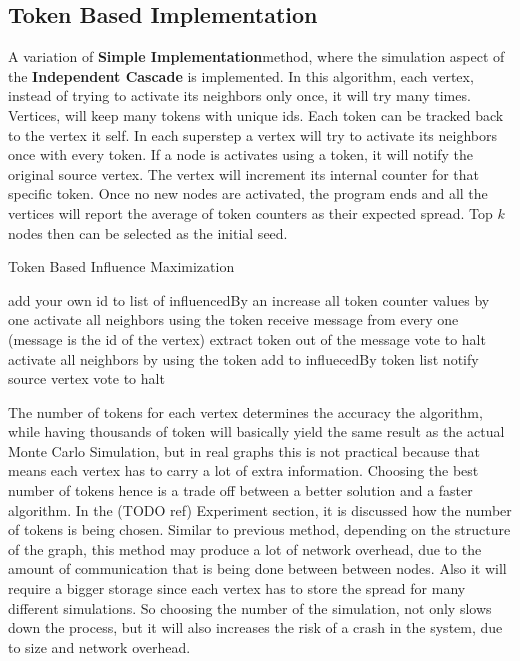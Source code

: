 \documentclass[english]{tktltiki}
\begin{document}
\subsection{Token Based Implementation}
A variation of \textbf{Simple Implementation}method, where the simulation aspect of the \textbf{Independent Cascade} is implemented. In this algorithm, each vertex, instead of trying to activate its neighbors only once, it will try many times. Vertices, will keep many tokens with unique ids. Each token can be tracked back to the vertex it self. In each superstep a vertex will try to activate its neighbors once with every token. If a node is activates using a token, it will notify the original source vertex. The vertex will increment its internal counter for that specific token. Once no new nodes are activated, the program ends and all the vertices will report the average of token counters as their expected spread. Top $k$ nodes then can be selected as the initial seed.
\begin{algorithm}[ht!]
\caption{Token Based Influence Maximization}
\begin{algorithmic}
	\State add your own id to list of influencedBy an increase all token counter values by one
		\State activate all neighbors using the token
	\EndFor
\Else
	\State receive message from every one (message is the id of the vertex)
		\State extract token out of the message
			\State vote to halt
		\Else
			\State activate all neighbors by using the token
			\State add to influecedBy token list 
			\State notify source vertex
			\State vote to halt
		\EndIf
		
	\EndFor
\EndIf
\end{algorithmic}
\end{algorithm}
The number of tokens for each vertex determines the accuracy the algorithm, while having thousands of token will basically yield the same result as the actual Monte Carlo Simulation, but in real graphs this is not practical because that means each vertex has to carry a lot of extra information. Choosing the best number of tokens hence is a trade off between a better solution and a faster algorithm. In the (TODO ref) Experiment section, it is discussed how the number of tokens is being chosen. Similar to previous method, depending on the structure of the graph, this method may produce a lot of network overhead, due to the amount of communication that is being done between between nodes. Also it will require a bigger storage since each vertex has to store the spread for many different simulations. So choosing the number of the simulation, not only slows down the process, but it will also increases the risk of a crash in the system, due to size and network overhead.
\end{document}
